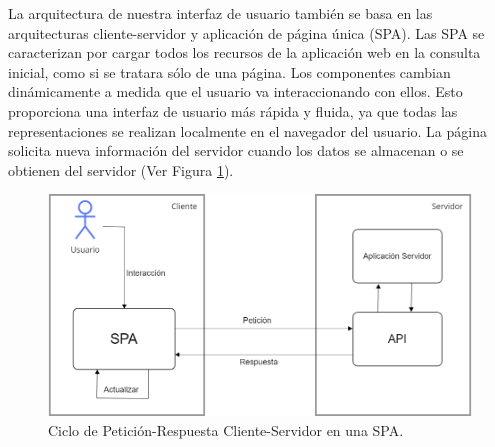 
La arquitectura de nuestra interfaz de usuario también se basa en las arquitecturas cliente-servidor y aplicación de página única (SPA). Las SPA se caracterizan por cargar todos los recursos de la aplicación web en la consulta inicial, como si se tratara sólo de una página. Los componentes cambian dinámicamente a medida que el usuario va interaccionando con ellos. Esto proporciona una interfaz de usuario más rápida y fluida, ya que todas las representaciones se realizan localmente en el navegador del usuario. La página solicita nueva información del servidor cuando los datos se almacenan o se obtienen del servidor (Ver Figura \ref{fig:spa}).

\begin{figure}[htbp]
\centering
\includegraphics[scale=0.4]{Graphics/mySPAt}
\caption{Ciclo de Petición-Respuesta Cliente-Servidor en una SPA.}
\label{fig:spa}
\end{figure}
 
%
%

